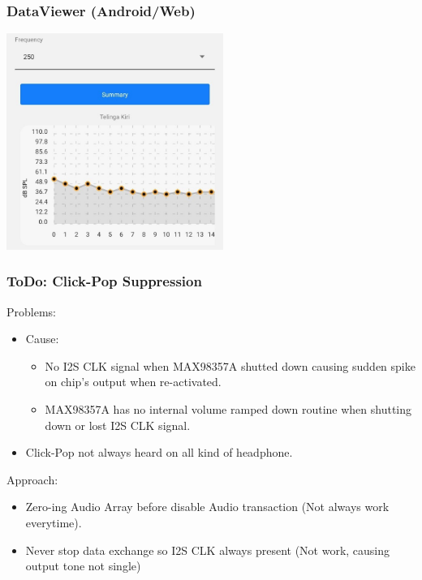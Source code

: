 \documentclass[table,dvipsnames]{beamer}
\begin{document}
	\begin{frame}[fragile]
		\frametitle{DataViewer (Android/Web)}
		
		\begin{exampleblock}{}
			\begin{center}
				\includegraphics[width=200pt]{images/elbicare_android}
			\end{center}
		\end{exampleblock}
	\end{frame}

	\begin{frame}[fragile]
		\frametitle{ToDo: Click-Pop Suppression}
		
		\begin{exampleblock}{}
			Problems:
			\begin{itemize}
				\item Cause:
				\begin{itemize}
					\item No I2S CLK signal when MAX98357A shutted down causing sudden spike on chip's output when re-activated.
					\item MAX98357A has no internal volume ramped down routine when shutting down or lost I2S CLK signal.
				\end{itemize}
			
				\item Click-Pop not always heard on all kind of headphone.
			\end{itemize}
		\end{exampleblock}
	
		\begin{exampleblock}{}
			Approach:
			\begin{itemize}
				\item Zero-ing Audio Array before disable Audio transaction (Not always work everytime).
				\item Never stop data exchange so I2S CLK always present (Not work, causing output tone not single)
			\end{itemize}
		\end{exampleblock}
	\end{frame}
\end{document}
